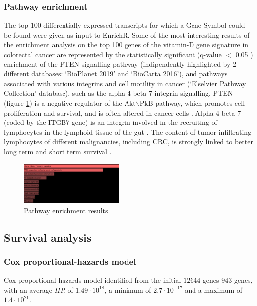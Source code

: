 \documentclass[fleqn,10pt]{SelfArx} %
\begin{document}
		\subsubsection{Pathway enrichment}
		The top 100 differentially expressed transcripts for which a Gene Symbol could be found were given as input to EnrichR.
		Some of the most interesting results of the enrichment analysis on the top 100 genes of the vitamin-D gene signature in colorectal cancer are represented by the statistically significant (q-value $<$ 0.05 ) enrichment of the PTEN signalling pathway (indipendently highlighted by 2 different databases: ‘BioPlanet 2019’ and ‘BioCarta 2016’), and pathways associated with various integrins and cell motility in cancer (‘Elselvier Pathway Collection’ database), such as the alpha-4-beta-7 integrin signalling.
PTEN (figure \ref{fig:pten}) is a negative regulator of the Akt$\backslash$PkB pathway, which promotes cell proliferation and survival, and is often altered in cancer cells \cite{chalhoub2009pten}.
Alpha-4-beta-7 (coded by the ITGB7 gene) is an integrin involved in the recruiting of lymphocytes in the lymphoid tissue of the gut \cite{Alpha}.
The content of tumor-infiltrating lymphocytes of different malignancies, including CRC, is strongly linked to better long term and short term survival \cite{fuchs2020assessment}.


		\begin{figure}[ht]
			\includegraphics[width=0.45\textwidth]{figures/pten.png}
			\caption{Pathway enrichment results}
			\label{fig:pten}
		\end{figure}

	\subsection{Survival analysis}

		\subsubsection{Cox proportional-hazards model}
		Cox proportional-hazards model identified from the initial $12644$ genes $943$ genes, with an average $HR$ of $1.49\cdot 10^{18}$, a minimum of $2.7\cdot 10^{-17}$ and a maximum of $1.4\cdot 10^{21}$.
\end{document}
